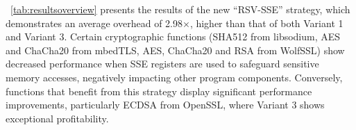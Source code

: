 
\T~\ref{tab:resultsoverview} presents the results of the new ``RSV-SSE'' strategy, which demonstrates an average overhead of 2.98$\times$, higher than that of both Variant 1 and Variant 3. 
Certain cryptographic functions (SHA512 from libsodium, AES and ChaCha20 from mbedTLS, AES, ChaCha20 and RSA from WolfSSL) show decreased performance when SSE registers are used to safeguard sensitive memory accesses, negatively impacting other program components. 
Conversely, functions that benefit from this strategy display significant performance improvements, particularly ECDSA from OpenSSL, where Variant 3 shows exceptional profitability.

